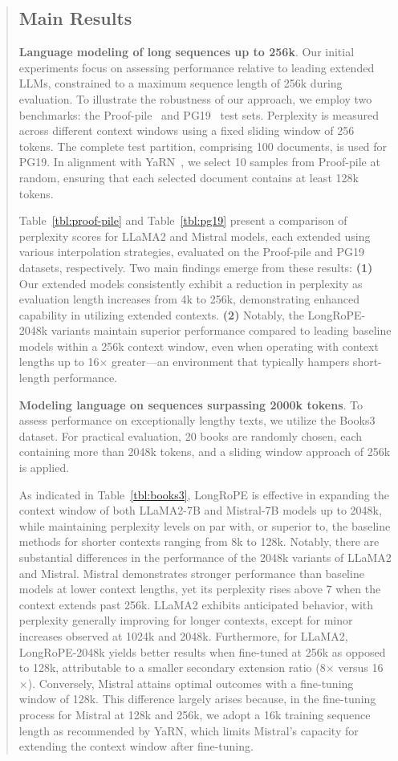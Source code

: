 \begin{abstract}
\subsection{Main Results}

\label{sec:mainresult}
\textbf{Language modeling of long sequences up to 256k}. Our initial experiments focus on assessing performance relative to leading extended LLMs, constrained to a maximum sequence length of 256k during evaluation. To illustrate the robustness of our approach, we employ two benchmarks: the Proof-pile~\cite{pg19} and PG19~\cite{pile} test sets. Perplexity is measured across different context windows using a fixed sliding window of 256 tokens. The complete test partition, comprising 100 documents, is used for PG19. In alignment with YaRN~\cite{yarn}, we select 10 samples from Proof-pile at random, ensuring that each selected document contains at least 128k tokens.

Table~\ref{tbl:proof-pile} and Table~\ref{tbl:pg19} present a comparison of perplexity scores for LLaMA2 and Mistral models, each extended using various interpolation strategies, evaluated on the Proof-pile and PG19 datasets, respectively. Two main findings emerge from these results: \textbf{(1)} Our extended models consistently exhibit a reduction in perplexity as evaluation length increases from 4k to 256k, demonstrating enhanced capability in utilizing extended contexts. \textbf{(2)} Notably, the LongRoPE-2048k variants maintain superior performance compared to leading baseline models within a 256k context window, even when operating with context lengths up to 16$\times$ greater—an environment that typically hampers short-length performance.

\textbf{Modeling language on sequences surpassing 2000k tokens}. To assess performance on exceptionally lengthy texts, we utilize the Books3~\cite{pile} dataset. For practical evaluation, 20 books are randomly chosen, each containing more than 2048k tokens, and a sliding window approach of 256k is applied.

As indicated in Table~\ref{tbl:books3}, LongRoPE is effective in expanding the context window of both LLaMA2-7B and Mistral-7B models up to 2048k, while maintaining perplexity levels on par with, or superior to, the baseline methods for shorter contexts ranging from 8k to 128k. Notably, there are substantial differences in the performance of the 2048k variants of LLaMA2 and Mistral. Mistral demonstrates stronger performance than baseline models at lower context lengths, yet its perplexity rises above 7 when the context extends past 256k. LLaMA2 exhibits anticipated behavior, with perplexity generally improving for longer contexts, except for minor increases observed at 1024k and 2048k. Furthermore, for LLaMA2, LongRoPE-2048k yields better results when fine-tuned at 256k as opposed to 128k, attributable to a smaller secondary extension ratio (8$\times$ versus 16$\times$). Conversely, Mistral attains optimal outcomes with a fine-tuning window of 128k. This difference largely arises because, in the fine-tuning process for Mistral at 128k and 256k, we adopt a 16k training sequence length as recommended by YaRN, which limits Mistral’s capacity for extending the context window after fine-tuning.


\end{abstract}
